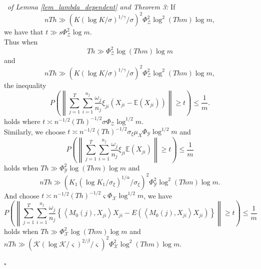 \documentclass[12pt]{article}
\newenvironment{pf}{{\noindent\it Proof}\ }{\hfill $\square$\par}
\begin{document}
\begin{pf}{\it of Lemma \ref{lem_lambda_dependent} and Theorem 3:}
  If $$nTh \gg (K(\log K/\sigma)^{1/\gamma}/\sigma)^2\Phi_\mathcal{Z}^2\log^2 (Thm) \log m,$$ we have that $t \gg s\Phi_\mathcal{Z}^2 \log m$.\\
  Thus when $$Th \gg \Phi_\mathcal{Z}^{2}\log (Thm)\log m$$ and $$nTh \gg (K(\log K/\sigma)^{1/\gamma}/\sigma)^2\Phi_\mathcal{Z}^2\log^2 (Thm) \log m,$$ the inequality
   \begin{equation*}
  P\left(\left\|\sum_{j=1}^T \sum_{i=1}^{n_j} \frac{\omega_j}{n_j}\xi_{ji}(X_{ji}-\mathbb{E}(X_{ji}))\right\|\ge t \right)  \le \frac{1}{m}.
  \end{equation*}
  holds where $t \asymp n^{-1/2}(Th)^{-1/2}\sigma \Phi_\mathcal{Z} \log^{1/2} m.$\\
  Similarly, we choose $t\asymp n^{-1/2}(Th)^{-1/2}\sigma_\xi \mu_X \Phi_\mathcal{Y}\log^{1/2} m$ and
  \begin{equation*}
  P\left(\left\|\sum_{j=1}^T\sum_{i=1}^{n_j} \frac{\omega_j}{n_j}\xi_{j i} \mathbb{E}(X_{ji})\right\|\ge t\right)\le \frac{1}{m}
  \end{equation*}
  holds when $Th \gg \Phi_{\mathcal{Y}}^2 \log (Thm)\log m$ and $$nTh \gg (K_1(\log K_1/\sigma_\xi)^{1/\alpha}/\sigma_\xi)^2\Phi_\mathcal{Y}^2\log^2 (Thm) \log m.$$
  And choose $t\asymp n^{-1/2}(Th)^{-1/2} \varsigma \Phi_\mathcal{X}\log^{1/2} m$, we have
  \begin{equation*}
  P\left(\left\|\sum_{j=1}^{T} \sum_{i=1}^{n_{j}} \frac{\omega_j}{n_{j}} \left\{\left\langle M_0(j),X_{j i}\right\rangle X_{ji}-E\left(\left\langle M_0(j),X_{j i}\right\rangle X_{j i}\right)\right\}\right\|\ge t\right)\le \frac{1}{m}
  \end{equation*}
  holds when $Th \gg \Phi_{\mathcal{X}}^2 \log (Thm)\log m$ and $nTh \gg (\mathcal{K}(\log \mathcal{K}/\varsigma)^{2/\beta}/\varsigma)^2\Phi_\mathcal{X}^2\log^2 (Thm) \log m$.


\end{pf}
\end{document}
